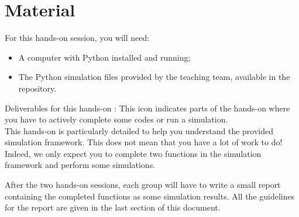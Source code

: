 \section*{Material}

\begin{comment}[couleur = gray!20, arrondi = 0.2, logo=\bcinfo]{}
\vspace{0.2cm}
\end{comment}
For this hands-on session, you will need:
\begin{itemize}
    \item A computer with Python installed and running;
    \item The Python simulation files provided by the teaching team, available in the repository.
\end{itemize}
\begin{bclogo}[couleur = gray!20, arrondi = 0.2, logo=\bcinfo]{Deliverables for this hands-on}
\bccrayon: This icon indicates parts of the hands-on where you have to actively complete some codes or run a simulation.\\

This hands-on is particularly detailed to help you understand the provided simulation framework. This does not mean that you have a lot of work to do! Indeed, we only expect you to complete two functions in the simulation framework and perform some simulations.

After the two hands-on sessions, each group will have to write a small report containing the completed functions as some simulation results. All the guidelines for the report are given in the last section of this document.

\end{bclogo}
